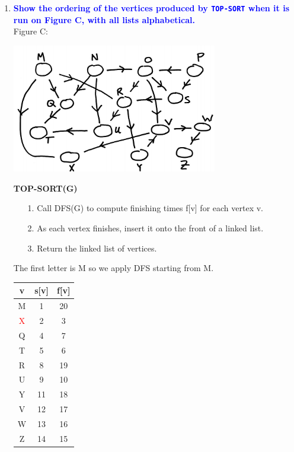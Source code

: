 \documentclass[11pt]{article}
\begin{document}
\begin{enumerate}
\item \textbf{\textcolor{blue}{Show the ordering of the vertices produced by {\tt TOP-SORT}
when it is run on Figure C, with all lists alphabetical.}}
\\ Figure C: \\
\begin{center}
    \includegraphics[width=90mm]{figureC.jpg}
\end{center}
    \textbf{TOP-SORT(G)}
    \begin{itemize}
        \item [1.] Call DFS(G) to compute finishing times f[v] for each vertex v.
        \item [2.] As each vertex finishes, insert it onto the front of a linked list.
        \item [3.] Return the linked list of vertices.
    \end{itemize}
    The first letter is M so we apply DFS starting from M.
    \begin{center}
        \begin{tabular}{|c | c | c |} 
        \hline
        v & s[v] & f[v] \\ [0.5ex] 
        \hline\hline
        M & 1 & 20 \\
        \hline
        \textcolor{red}{X} & 2 & 3 \\
        \hline
        Q & 4 & 7 \\
        \hline
        T & 5 & 6 \\
        \hline
        R & 8 & 19 \\
        \hline
        U & 9 & 10 \\
        \hline
        Y & 11 & 18 \\
        \hline
        V & 12 & 17 \\
        \hline
        W & 13 & 16 \\
        \hline
        Z & 14 & 15 \\ [1ex] 
        \hline
        \end{tabular}

\end{center}
\end{enumerate}
\end{document}
